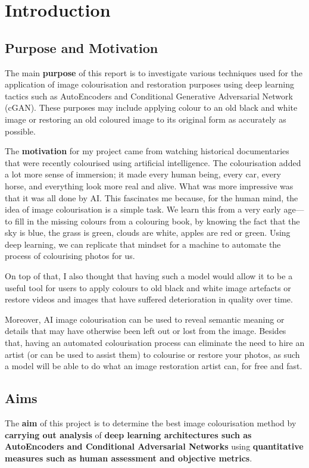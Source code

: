 
\chapter{Introduction}
\section{Purpose and Motivation}
The main \textbf{purpose} of this report is to investigate various techniques used for the application of image colourisation and restoration purposes using deep learning tactics such as AutoEncoders and Conditional Generative Adversarial Network (cGAN). These purposes may include applying colour to an old black and white image or restoring an old coloured image to its original form as accurately as possible.  

The \textbf{motivation} for my project came from watching historical documentaries that were recently colourised using artificial intelligence. The colourisation added a lot more sense of immersion; it made every human being, every car, every horse, and everything look more real and alive. What was more impressive was that it was all done by AI. This fascinates me because, for the human mind, the idea of image colourisation is a simple task. We learn this from a very early age—to fill in the missing colours from a colouring book, by knowing the fact that the sky is blue, the grass is green, clouds are white, apples are red or green. Using deep learning, we can replicate that mindset for a machine to automate the process of colourising photos for us.

On top of that, I also thought that having such a model would allow it to be a useful tool for users to apply colours to old black and white image artefacts or restore videos and images that have suffered deterioration in quality over time. 

Moreover, AI image colourisation can be used to reveal semantic meaning or details that may have otherwise been left out or lost from the image. Besides that, having an automated colourisation process can eliminate the need to hire an artist (or can be used to assist them) to colourise or restore your photos, as such a model will be able to do what an image restoration artist can, for free and fast.

\section{Aims}
The \textbf{aim} of this project is to determine the best image colourisation method by \textbf{carrying out analysis} of \textbf{deep learning architectures such as AutoEncoders and Conditional Adversarial Networks} using \textbf{quantitative measures such as human assessment and objective metrics}.

